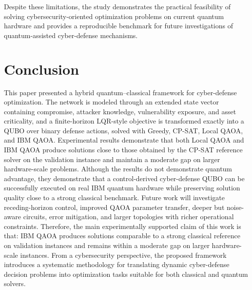 \documentclass[runningheads]{llncs}
\begin{document}
Despite these limitations, the study demonstrates the practical feasibility of solving cybersecurity-oriented optimization problems on current quantum hardware and provides a reproducible benchmark for future investigations of quantum-assisted cyber-defense mechanisms.

\section{Conclusion}
\label{sec:conclusion}

This paper presented a hybrid quantum--classical framework for cyber-defense optimization. The network is modeled through an extended state vector containing compromise, attacker knowledge, vulnerability exposure, and asset criticality, and a finite-horizon LQR-style objective is transformed exactly into a QUBO over binary defense actions, solved with Greedy, CP-SAT, Local QAOA, and IBM QAOA. Experimental results demonstrate that both Local QAOA and IBM QAOA produce solutions close to those obtained by the CP-SAT reference solver on the validation instance and maintain a moderate gap on larger hardware-scale problems. Although the results do not demonstrate quantum advantage, they demonstrate that a control-derived cyber-defense QUBO can be successfully executed on real IBM quantum hardware while preserving solution quality close to a strong classical benchmark. Future work will investigate receding-horizon control, improved QAOA parameter transfer, deeper but noise-aware circuits, error mitigation, and larger topologies with richer operational constraints. Therefore, the main experimentally supported claim of this work is that: IBM QAOA produces solutions comparable to a strong classical reference on validation instances and remains within a moderate gap on larger hardware-scale instances. From a cybersecurity perspective, the proposed framework introduces a systematic methodology for translating dynamic cyber-defense decision problems into optimization tasks suitable for both classical and quantum solvers.
\end{document}
